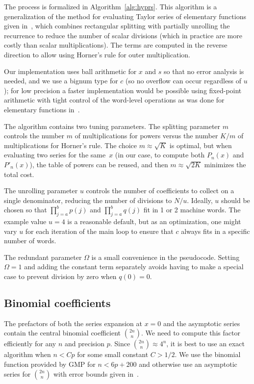 \documentclass[11pt,a4paper]{article}
\begin{document}
The process is formalized in Algorithm \ref{alg:hyprs}.
This algorithm is a generalization of the
method for evaluating Taylor series of elementary
functions given in~\cite{Johansson2015elementary},
which combines rectangular splitting
with partially unrolling the recurrence to reduce the number of scalar divisions
(which in practice are more costly than scalar multiplications).
The terms are computed in the reverse direction to allow
using Horner's rule for outer
multiplication.

Our implementation uses ball arithmetic for $x$ and $s$
so that no error analysis is needed, and we use a bignum type for $c$ (so
no overflow can occur regardless of $u$);
for low precision a faster implementation
would be possible using fixed-point arithmetic with tight
control of the word-level operations
as was done for elementary functions in~\cite{Johansson2015elementary}.

The algorithm contains two tuning parameters.
The splitting parameter $m$ controls the
number $m$ of multiplications for powers versus the number $K / m$ of
multiplications for Horner's rule.
The choice $m \approx \sqrt K$ is optimal,
but when evaluating two series for the same~$x$
(in our case, to compute both $P_n(x)$ and $P'_n(x)$),
the table of powers can be reused,
and then $m \approx \sqrt{2K}$ minimizes the total cost.

The unrolling parameter $u$ controls the number of coefficients
to collect on a single denominator, reducing the
number of divisions to $N / u$.
Ideally, $u$ should be chosen
so that $\prod_{j=a}^b p(j)$
and $\prod_{j=a}^b q(j)$ fit in 1 or 2 machine words.
The example value $u = 4$ is a reasonable
default, but as an optimization, one might vary $u$
for each iteration of the main loop
to ensure that $c$ always fits in a specific number of words.

The redundant parameter $\Omega$ is a small convenience in the pseudocode.
Setting $\Omega = 1$ and adding the constant term separately
avoids having to make a special case to prevent division by zero
when $q(0) = 0$.

\subsection{Binomial coefficients}

The prefactors of both the series expansion at $x = 0$ and the asymptotic series
contain the central binomial coefficient ${2n \choose n}$.
We need to compute this factor efficiently for any $n$ and precision $p$.
Since ${2n \choose n} \approx 4^n$, it is best to use
an exact algorithm when $n < Cp$ for some small constant $C > 1/2$.
We use the binomial function provided by GMP for $n < 6p + 200$
and otherwise use an asymptotic series for ${2n \choose n}$
with error bounds given in~\cite{brent2016asymptotic}.
\end{document}
